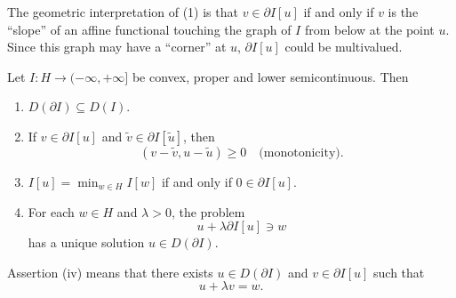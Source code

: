 The geometric interpretation of (1) is that $v \in \partial I[u]$ if and only if $v$ is the ``slope'' of an affine functional touching the graph of $I$ from below at the point $u$. Since this graph may have a ``corner'' at $u$, $\partial I[u]$ could be multivalued.

\begin{theorem}
\label{thm:properties-of-subdifferentials}
Let $I : H \to (-\infty, +\infty]$ be convex, proper and lower semicontinuous. Then
\begin{enumerate}
\item[(i)] $D(\partial I) \subseteq D(I)$.
\item[(ii)] If $v \in \partial I[u]$ and $\tilde{v} \in \partial I[\tilde{u}]$, then
\[
(v - \tilde{v}, u - \tilde{u}) \geq 0 \quad \text{(monotonicity)}.
\]
\item[(iii)] $I[u] = \min_{w \in H} I[w]$ if and only if $0 \in \partial I[u]$.
\item[(iv)] For each $w \in H$ and $\lambda > 0$, the problem
\[
u + \lambda \partial I[u] \ni w
\]
has a unique solution $u \in D(\partial I)$.
\end{enumerate}
Assertion (iv) means that there exists $u \in D(\partial I)$ and $v \in \partial I[u]$ such that
\[
u + \lambda v = w.
\]
\end{theorem}
